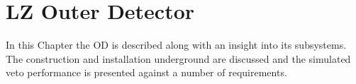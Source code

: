 \chapter{LZ Outer Detector}
\label{chapter:lz_outer_detector}
\par
In this Chapter the OD is described along with an insight into its subsystems.
The construction and installation underground are discussed and the simulated veto performance is presented against a number of requirements.







